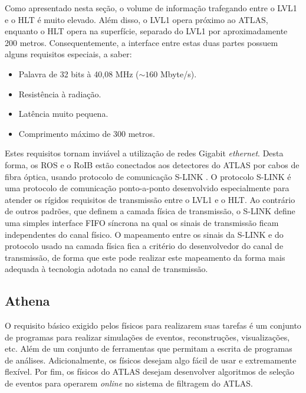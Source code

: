 Como apresentado nesta seção, o volume de informação trafegando entre o LVL1 e o HLT é muito elevado. Além disso, o LVL1 opera próximo ao ATLAS, enquanto o HLT opera na superfície, separado do LVL1 por aproximadamente 200 metros. Consequentemente, a interface entre estas duas partes possuem alguns requisitos especiais, a saber:

\begin{itemize}

\item Palavra de 32 bits à 40,08 MHz ($\sim160$ Mbyte/s).

\item Resistência à radiação.

\item Latência muito pequena.

\item Comprimento máximo de 300 metros.

\end{itemize}

Estes requisitos tornam inviável a utilização de redes Gigabit \emph{ethernet}. Desta forma, os ROS e o RoIB estão conectados aos detectores do ATLAS por cabos de fibra óptica, usando protocolo de comunicação S-LINK \cite{bib:slink_spec}. O protocolo S-LINK é uma protocolo de comunicação ponto-a-ponto desenvolvido especialmente para atender os rígidos requisitos de transmissão entre o LVL1 e o HLT. Ao contrário de outros padrões, que definem a camada física de transmissão, o S-LINK define uma simples interface FIFO síncrona na qual os sinais de transmissão ficam independentes do canal físico. O mapeamento entre os sinais da S-LINK e do protocolo usado na camada física fica a critério do desenvolvedor do canal de transmissão, de forma que este pode realizar este mapeamento da forma mais adequada à tecnologia adotada no canal de transmissão.


\subsection{Athena}
\label{sec:offline}

O requisito básico exigido pelos físicos para realizarem suas tarefas é um conjunto de programas para realizar simulações de eventos, reconstruções, visualizações, etc. Além de um conjunto de ferramentas que permitam a escrita de programas de análises. Adicionalmente, os físicos desejam algo fácil de usar e extremamente flexível. Por fim, os físicos do ATLAS desejam desenvolver algoritmos de seleção de eventos para operarem \emph{online} no sistema de filtragem do ATLAS.

